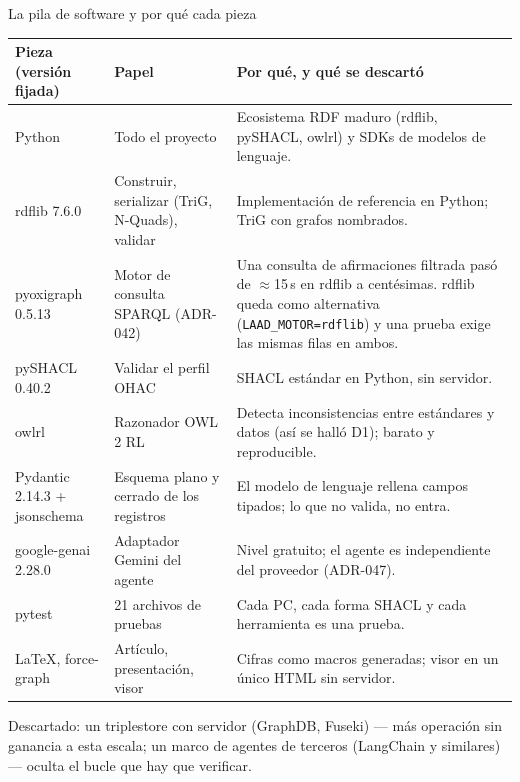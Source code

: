\documentclass[aspectratio=169,10pt]{beamer}
\newcommand{\ttt}[1]{\texttt{\small #1}}
\begin{document}
\begin{frame}[shrink=11]{La pila de software y por qué cada pieza}
\scriptsize
\begin{tabular}{@{}p{2.5cm}p{3.6cm}p{7.1cm}@{}}
\toprule
Pieza (versión fijada) & Papel & Por qué, y qué se descartó \\
\midrule
Python & Todo el proyecto & Ecosistema RDF maduro (rdflib, pySHACL, owlrl) y SDKs de modelos de lenguaje. \\
rdflib 7.6.0 & Construir, serializar (TriG, N-Quads), validar & Implementación de referencia en Python; TriG con grafos nombrados. \\
pyoxigraph 0.5.13 & Motor de consulta SPARQL (ADR-042) & Una consulta de afirmaciones filtrada pasó de \alert{$\approx$15\,s} en rdflib a \alert{centésimas}. rdflib queda como alternativa (\ttt{LAAD\_MOTOR=rdflib}) y una prueba exige las mismas filas en ambos. \\
pySHACL 0.40.2 & Validar el perfil OHAC & SHACL estándar en Python, sin servidor. \\
owlrl & Razonador OWL 2 RL & Detecta inconsistencias entre estándares y datos (así se halló D1); barato y reproducible. \\
Pydantic 2.14.3 + jsonschema & Esquema plano y cerrado de los registros & El modelo de lenguaje rellena campos tipados; lo que no valida, no entra. \\
google-genai 2.28.0 & Adaptador Gemini del agente & Nivel gratuito; el agente es independiente del proveedor (ADR-047). \\
pytest & 21 archivos de pruebas & Cada PC, cada forma SHACL y cada herramienta es una prueba. \\
LaTeX, force-graph & Artículo, presentación, visor & Cifras como macros generadas; visor en un único HTML sin servidor. \\
\bottomrule
\end{tabular}

\medskip
\footnotesize Descartado: un triplestore con servidor (GraphDB, Fuseki) — más operación sin ganancia a esta escala;
un marco de agentes de terceros (LangChain y similares) — oculta el bucle que hay que verificar.
\end{frame}
\end{document}
